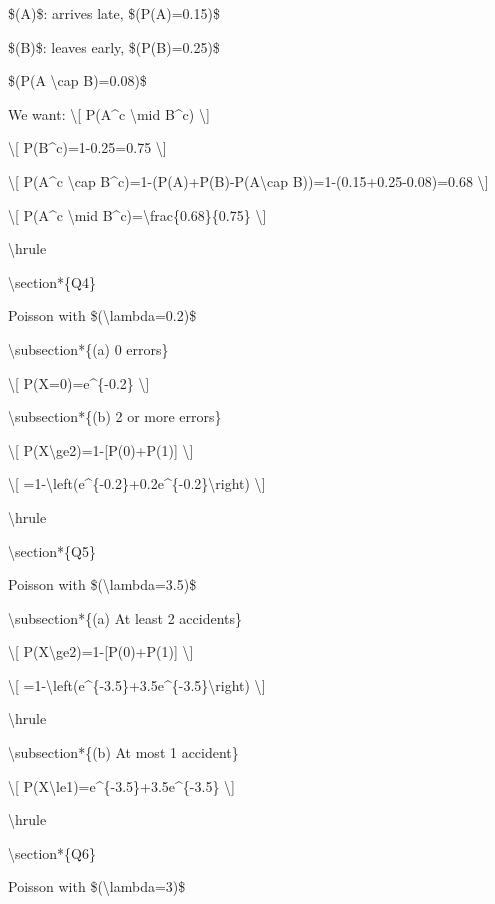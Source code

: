 \$(A)\$: arrives late, \$(P(A)=0.15)\$

\$(B)\$: leaves early, \$(P(B)=0.25)\$

\$(P(A \textbackslash cap B)=0.08)\$

We want: \textbackslash{[} P(A\^{}c \textbackslash mid B\^{}c)
\textbackslash{]}

\textbackslash{[} P(B\^{}c)=1-0.25=0.75 \textbackslash{]}

\textbackslash{[} P(A\^{}c \textbackslash cap
B\^{}c)=1-(P(A)+P(B)-P(A\textbackslash cap B))=1-(0.15+0.25-0.08)=0.68
\textbackslash{]}

\textbackslash{[} P(A\^{}c \textbackslash mid
B\^{}c)=\textbackslash frac\{0.68\}\{0.75\} \textbackslash{]}

\textbackslash hrule

\textbackslash section*\{Q4\}

Poisson with \$(\textbackslash lambda=0.2)\$

\textbackslash subsection*\{(a) 0 errors\}

\textbackslash{[} P(X=0)=e\^{}\{-0.2\} \textbackslash{]}

\textbackslash subsection*\{(b) 2 or more errors\}

\textbackslash{[} P(X\textbackslash ge2)=1-{[}P(0)+P(1){]}
\textbackslash{]}

\textbackslash{[}
=1-\textbackslash left(e\^{}\{-0.2\}+0.2e\^{}\{-0.2\}\textbackslash right)
\textbackslash{]}

\textbackslash hrule

\textbackslash section*\{Q5\}

Poisson with \$(\textbackslash lambda=3.5)\$

\textbackslash subsection*\{(a) At least 2 accidents\}

\textbackslash{[} P(X\textbackslash ge2)=1-{[}P(0)+P(1){]}
\textbackslash{]}

\textbackslash{[}
=1-\textbackslash left(e\^{}\{-3.5\}+3.5e\^{}\{-3.5\}\textbackslash right)
\textbackslash{]}

\textbackslash hrule

\textbackslash subsection*\{(b) At most 1 accident\}

\textbackslash{[} P(X\textbackslash le1)=e\^{}\{-3.5\}+3.5e\^{}\{-3.5\}
\textbackslash{]}

\textbackslash hrule

\textbackslash section*\{Q6\}

Poisson with \$(\textbackslash lambda=3)\$

